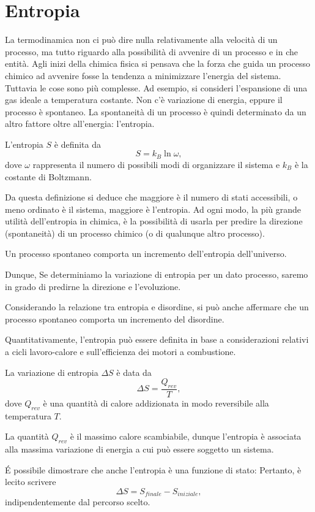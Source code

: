 \section{Entropia}
La termodinamica non ci può dire nulla
relativamente alla velocità di un processo, ma tutto riguardo alla possibilità di avvenire di un processo e in che entità. Agli inizi della chimica fisica si pensava che la forza che guida un processo chimico ad avvenire fosse la
tendenza a minimizzare l'energia del sistema. Tuttavia le cose sono più complesse. Ad esempio, si consideri l'espansione di una gas ideale a temperatura costante. Non c'è variazione di energia, eppure il processo è spontaneo. La spontaneità di un processo è quindi determinato da un altro fattore oltre all'energia: l'entropia.
\begin{defn}
    L'entropia $S$ è definita da
    \begin{equation}
        S=k_B\ln{\omega},
    \end{equation}
    dove $\omega$ rappresenta il numero di possibili modi di organizzare il sistema e $k_B$ è la costante di Boltzmann.
\end{defn}
Da questa definizione si deduce che maggiore è il numero di stati accessibili, o meno ordinato è il sistema, maggiore è l'entropia. Ad ogni modo, la più grande utilità dell'entropia in chimica, è la possibilità di usarla per predire la direzione (spontaneità) di un processo chimico (o di qualunque altro processo).
    \begin{axiom}\label{ax:8}
        Un processo spontaneo comporta un incremento dell'entropia dell'universo.
    \end{axiom}
Dunque, Se determiniamo la variazione di entropia per un dato processo, saremo in grado di predirne la direzione e l'evoluzione.
\begin{obs}
     Considerando la relazione tra entropia e disordine, si può anche affermare che un processo spontaneo comporta un incremento del disordine.
\end{obs}
Quantitativamente, l'entropia può essere definita in base a considerazioni relativi a cicli lavoro-calore e sull'efficienza dei motori a combustione.
\begin{defn}
    La variazione di entropia $\Delta S$ è data da
    \begin{equation}\label{eq:entrop.quantitat.}
        \Delta S=\frac{Q_{rev}}{T},
    \end{equation}
    dove $Q_{rev}$ è una quantità di calore addizionata in modo reversibile alla temperatura $T$. 
\end{defn}
\begin{obs}
    La quantità $Q_{rev}$ è il massimo calore scambiabile, dunque l'entropia è associata alla massima variazione di energia a cui può essere soggetto un sistema.
\end{obs}
\'E possibile dimostrare che anche l'entropia è una funzione di stato: Pertanto, è lecito scrivere
\begin{equation}
    \Delta S=S_{finale}-S_{iniziale},
\end{equation}
indipendentemente dal percorso scelto.


